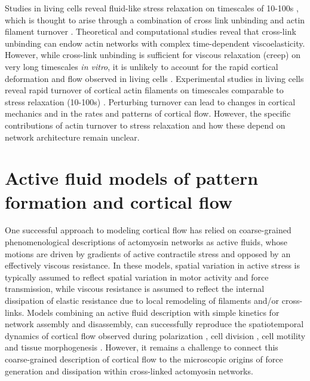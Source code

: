 Studies in living cells reveal fluid-like stress relaxation on timescales of 10-100s \cite{cellmech_flows,cellmech_flows2,cellmech_flows3,rheo_fluid,rheo_fluid2,cell_rheo_exp}, which is thought to arise through a combination of cross link unbinding and actin filament turnover \cite{De-La-Cruz:2015aa,De-La-Cruz:2009aa,Salbreux2012536}.  Theoretical \cite{theo_crosslinkslip1,theo_crosslinkslip2} and computational \cite{model_taeyoon,rheo_crosslinkslip2,theo_crosslinkslip3} studies reveal that cross-link unbinding can endow actin networks with complex time-dependent viscoelasticity. However, while cross-link unbinding is sufficient for viscous relaxation (creep) on very long timescales {\em in vitro}, it is unlikely to account for the rapid cortical deformation and flow observed in living cells \cite{rheo_crosslinksmatter,rheo_crosslinkslip1,rheo_crosslinkslip2,rheo_crosslinkslip3,rheo_nonaffine}.  Experimental studies in living cells reveal rapid turnover of cortical actin filaments on timescales comparable to stress relaxation (10-100s) \cite{Robin:2014aa,Fritzsche:2013aa,Fritzschee1501337,Carlsson:2010aa,Lai:2008aa}.  Perturbing turnover can lead to changes in cortical mechanics and in the rates and patterns of cortical flow\cite{Van-Goor:2012aa,Fritzschee1501337}.  However, the specific contributions of actin turnover to stress relaxation and how these depend on network architecture remain unclear.  








\section{Active fluid models of pattern formation and cortical flow}
One successful approach to modeling cortical flow has relied on coarse-grained phenomenological descriptions of actomyosin networks as active fluids, whose motions are driven by gradients of active contractile stress and opposed by an effectively viscous resistance\cite{cellmech_flows}.  In these models, spatial variation in active stress is typically assumed to reflect spatial variation in motor activity and force transmission\cite{PhysRevLett.106.028103}, while viscous resistance is assumed to reflect the internal dissipation of elastic resistance due to local remodeling of filaments and/or cross-links\cite{Salbreux2012536, De-La-Cruz:2015aa}. Models combining an active fluid description with simple kinetics for network assembly and disassembly, can successfully reproduce the spatiotemporal dynamics of cortical flow observed during polarization \cite{cellmech_flows}, cell division \cite{Turlier2014114,PhysRevLett.103.058102}, cell motility \cite{Keren:2009aa,RevModPhys.85.1143} and tissue morphogenesis \cite{Behrndt257}. However, it remains a challenge to connect this coarse-grained description of cortical flow to the microscopic origins of force generation and dissipation within cross-linked actomyosin networks. 


